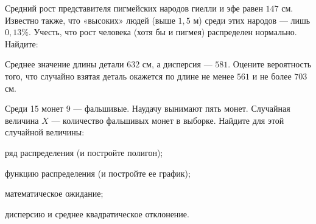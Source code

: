 \vfil

\begin{zkrPlain}{25}\noindent 
	Средний рост представителя пигмейских народов гиелли и эфе равен $147$ см. Известно также, что «высоких» людей (выше $1{,}5$ м) среди этих народов — лишь $0{,}13\%$. Учесть, что рост человека (хотя бы и пигмея) распределен нормально. Найдите: \par {}
 
\end{zkrPlain}

\vfil

\begin{zkrPlain}{25}\noindent 
	Среднее значение длины детали $ 632 $ см, а дисперсия --- $ 581 $. Оцените вероятность того, что случайно взятая деталь окажется по длине не менее $ 561 $ и не более $ 703 $ см.
 
\end{zkrPlain}

\newpage\setcounter{zad}{0}\setcounter{footnote}{0}



\begin{zkrPlain}{25}\noindent 
	Среди 15 монет 9 --- фальшивые. Наудачу вынимают пять монет. Случайная величина $X$ --- количество фальшивых монет в выборке.  Найдите для этой случайной величины: \par \smallskip\small{ \par \zz ряд распределения (и постройте полигон); \par \zz функцию распределения (и постройте ее график); \par \zz математическое ожидание; \par \zz дисперсию и среднее квадратическое отклонение.\par \par}
 
\end{zkrPlain}

\vfil

